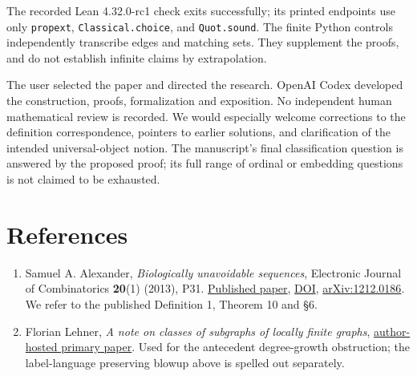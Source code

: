 \documentclass[
  11pt,
]{article}
\providecommand{\tightlist}{%
  \setlength{\itemsep}{0pt}\setlength{\parskip}{0pt}}
\begin{document}
The recorded Lean 4.32.0-rc1 check exits successfully; its printed
endpoints use only \texttt{propext}, \texttt{Classical.choice}, and
\texttt{Quot.sound}. The finite Python controls independently transcribe
edges and matching sets. They supplement the proofs, and do not
establish infinite claims by extrapolation.

The user selected the paper and directed the research. OpenAI Codex
developed the construction, proofs, formalization and exposition. No
independent human mathematical review is recorded. We would especially
welcome corrections to the definition correspondence, pointers to
earlier solutions, and clarification of the intended universal-object
notion. The manuscript's final classification question is answered by
the proposed proof; its full range of ordinal or embedding questions is
not claimed to be exhausted.

\section{References}\label{references}

\begin{enumerate}
\def\labelenumi{\arabic{enumi}.}
\tightlist
\item
  Samuel A. Alexander, \emph{Biologically unavoidable sequences},
  Electronic Journal of Combinatorics \textbf{20}(1) (2013), P31.
  \href{https://www.combinatorics.org/ojs/index.php/eljc/article/download/v20i1p31/pdf/}{Published
  paper}, \href{https://doi.org/10.37236/3035}{DOI},
  \href{https://arxiv.org/abs/1212.0186}{arXiv:1212.0186}. We refer to
  the published Definition 1, Theorem 10 and §6.
\item
  Florian Lehner, \emph{A note on classes of subgraphs of locally finite
  graphs},
  \href{https://www.florian-lehner.net/pdf/universal-locally-finite.pdf}{author-hosted
  primary paper}. Used for the antecedent degree-growth obstruction; the
  label-language preserving blowup above is spelled out separately.
\end{enumerate}
\end{document}
